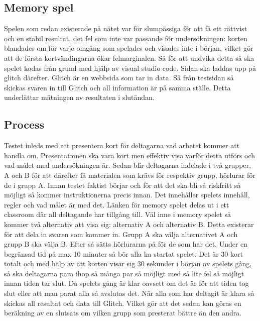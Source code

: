 \documentclass[11p]{article}
\begin{document}
    \subsection{Memory spel}
    Spelen som redan existerade på nätet var för slumpässiga för att få ett rättvist och en stabil resultat.
    det fel som inte var passande för undersökningen: korten blandades om för varje omgång som spelades och visades inte i början, vilket gör att de första kortvändingarna ökar felmarginalen.
    Så för att undvika detta så ska spelet kodas från grund med hjälp av visual studio code.
    Sidan ska laddas upp på glitch därefter.
    Glitch är en webbsida som tar in data.
    Så från testsidan så skickas svaren in till Glitch och all information är på samma ställe.
    Detta underlättar mätningen av resultaten i slutändan.

    \subsection{Process}
    Testet inleds med att presentera kort för deltagarna vad arbetet kommer att handla om.
    Presentationen ska vara kort men effektiv visa varför detta utförs och vad målet med undersökningen är.
    Sedan blir deltagarna indelade i två grupper, A och B för att därefter få materialen som krävs för respektiv grupp, hörlurar för de i grupp A.
    Innan testet faktist börjar och för att det ska bli så riskfritt så möjligt så kommer instruktionerna precis innan.
    Det innehåller spelets innehåll, regler och vad målet är med det.
    Länken för memory spelet delas ut i ett classroom där all deltagande har tillgång till.
    Väl inne i memory spelet så kommer två alternativ att visa sig: alternativ A och alternativ B.
    Detta existerar för att dela in svaren som kommer in.
    Grupp A ska välja alternativet A och grupp B ska välja B.
    \newline Efter så sätts hörlurarna på för de som har det.
    Under en begränsad tid på max 10 minuter så bör alla ha startat spelet.
    Det är 30 kort totalt och med hälp av att korten visar sig 30 sekunder i början av spelets gång, så ska deltagarna para ihop så många par så möjligt med så lite fel så möjligt innan tiden tar slut.
    Då spelets gång är klar oavsett om det är för att tiden tog slut eller att man parat alla så avslutas det.
    När alla som har deltagit är klara så skickas all resultat och data till Glitch.
    Vilket gör att det sedan kan göras en beräkning av en slutsats om vilken grupp som presterat bättre än den andra.
\end{document}
